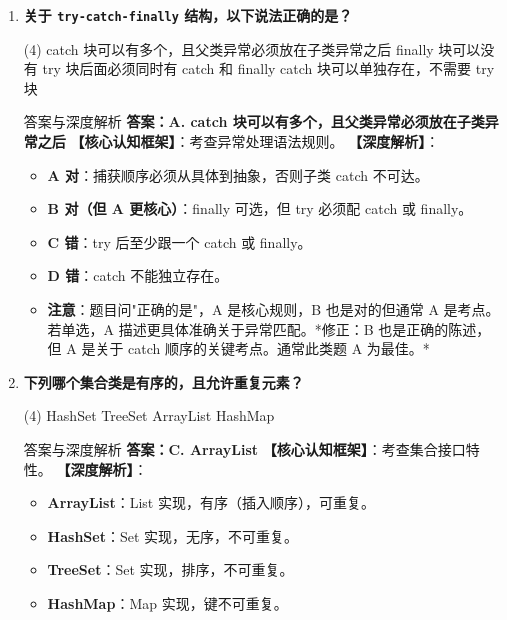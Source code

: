 \documentclass[12pt, a4paper]{ctexart}
\newcommand{\code}[1]{\texttt{#1}}
\begin{document}
\begin{enumerate}[label=\textbf{\arabic*.}, leftmargin=*, itemsep=1.5em]
\item \textbf{关于 \code{try-catch-finally} 结构，以下说法正确的是？}
\begin{tasks}(4)
    \task catch 块可以有多个，且父类异常必须放在子类异常之后
    \task finally 块可以没有 \task try 块后面必须同时有 catch 和 finally
    \task catch 块可以单独存在，不需要 try 块
\end{tasks}
\begin{bluebox}{答案与深度解析}
\textbf{答案：A. catch 块可以有多个，且父类异常必须放在子类异常之后}
\textbf{【核心认知框架】}：考查异常处理语法规则。
\textbf{【深度解析】}：
\begin{itemize}[leftmargin=*, nosep]
    \item \textbf{A 对}：捕获顺序必须从具体到抽象，否则子类 catch 不可达。
    \item \textbf{B 对（但 A 更核心）}：finally 可选，但 try 必须配 catch 或 finally。
    \item \textbf{C 错}：try 后至少跟一个 catch 或 finally。
    \item \textbf{D 错}：catch 不能独立存在。
    \item \textbf{注意}：题目问"正确的是"，A 是核心规则，B 也是对的但通常 A 是考点。若单选，A 描述更具体准确关于异常匹配。*修正：B 也是正确的陈述，但 A 是关于 catch 顺序的关键考点。通常此类题 A 为最佳。*
\end{itemize}
\end{bluebox}

\item \textbf{下列哪个集合类是有序的，且允许重复元素？}
\begin{tasks}(4)
    \task HashSet \task TreeSet \task ArrayList \task HashMap
\end{tasks}
\begin{bluebox}{答案与深度解析}
\textbf{答案：C. ArrayList}
\textbf{【核心认知框架】}：考查集合接口特性。
\textbf{【深度解析】}：
\begin{itemize}[leftmargin=*, nosep]
    \item \textbf{ArrayList}：List 实现，有序（插入顺序），可重复。
    \item \textbf{HashSet}：Set 实现，无序，不可重复。
    \item \textbf{TreeSet}：Set 实现，排序，不可重复。
    \item \textbf{HashMap}：Map 实现，键不可重复。
\end{itemize}
\end{bluebox}


\end{enumerate}
\end{document}
